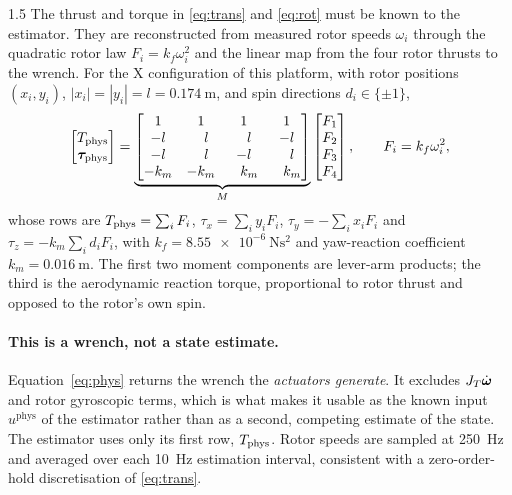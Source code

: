 \begin{spacing}{1.5}
The thrust and torque in \eqref{eq:trans} and \eqref{eq:rot} must be known to the
estimator. They are reconstructed from measured rotor speeds $\omega_i$ through
the quadratic rotor law $F_i = k_f \omega_i^2$ and the linear map from the four
rotor thrusts to the wrench. For the X configuration of this platform, with
rotor positions $(x_i,y_i)$, $|x_i|=|y_i|=l=\SI{0.174}{\meter}$, and spin
directions $d_i\in\{\pm1\}$,
\begin{equation}
\begin{bmatrix} T_{\mathrm{phys}} \\ \bm{\tau}_{\mathrm{phys}} \end{bmatrix}
=
\underbrace{
\begin{bmatrix}
1 & 1 & 1 & 1 \\
-l & \phantom{-}l & \phantom{-}l & -l \\
-l & \phantom{-}l & -l & \phantom{-}l \\
-k_m & -k_m & \phantom{-}k_m & \phantom{-}k_m
\end{bmatrix}}_{M}
\begin{bmatrix} F_1 \\ F_2 \\ F_3 \\ F_4 \end{bmatrix},
\qquad F_i = k_f \omega_i^2 ,
\label{eq:phys}
\end{equation}
whose rows are $T_{\mathrm{phys}}=\sum_i F_i$, $\tau_x=\sum_i y_iF_i$,
$\tau_y=-\sum_i x_iF_i$ and $\tau_z=-k_m\sum_i d_iF_i$, with
$k_f=\SI{8.55e-6}{\newton\second\squared}$ and yaw-reaction coefficient
$k_m=\SI{0.016}{\meter}$. The first two moment components are lever-arm
products; the third is the aerodynamic reaction torque, proportional to rotor
thrust and opposed to the rotor's own spin.

\paragraph{This is a wrench, not a state estimate.} Equation~\eqref{eq:phys}
returns the wrench the \emph{actuators generate}. It excludes $J_T\dot{\bm\omega}$
and rotor gyroscopic terms, which is what makes it usable as the known input
$u^{\mathrm{phys}}$ of the estimator rather than as a second, competing estimate
of the state. The estimator uses only its first row, $T_{\mathrm{phys}}$. Rotor speeds are
sampled at \SI{250}{\hertz} and averaged over each \SI{10}{\hertz} estimation
interval, consistent with a zero-order-hold discretisation of \eqref{eq:trans}.


\end{spacing}
